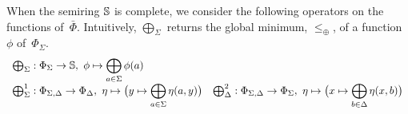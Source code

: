 %
%
\noindent
When the semiring $\mathbb{S}$ is complete, we
consider the following operators on the functions of~$\bar\Phi$. %
Intuitively, $\bigoplus_\Sigma$
returns the global minimum, \wrt $\leq_\oplus$, of a function $\phi$ of~$\Phi_\Sigma$.
\[
\begin{array}{ll}
\bigoplus_\Sigma : \Phi_\Sigma \to \mathbb{S},\
  \phi \mapsto \displaystyle\bigoplus_{a \in \Sigma} \phi(a)\\
\bigoplus^1_\Sigma :
  \Phi_{\Sigma,\Delta} \to \Phi_\Delta,\
  \eta \mapsto \bigl( y \mapsto \displaystyle\bigoplus_{a \in \Sigma} \eta(a, y) \bigr) &
\bigoplus^2_\Delta :
  \Phi_{\Sigma,\Delta} \to \Phi_\Sigma,\
  \eta \mapsto \bigl( x \mapsto \displaystyle\bigoplus_{b \in \Delta} \eta(x, b) \bigr)\\
\end{array}
\]
